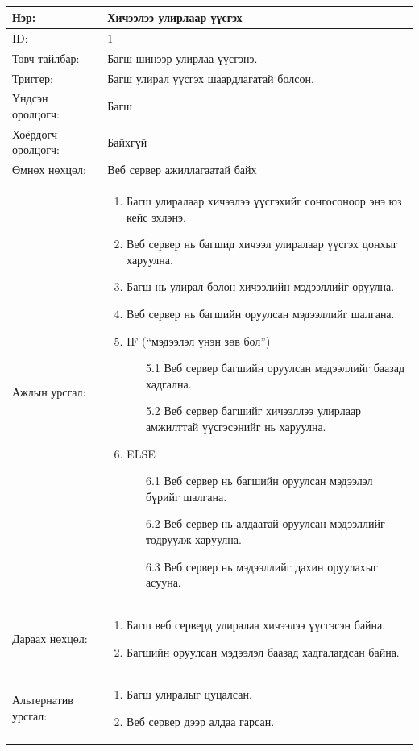 \begin{center}
	\begin{table}[!htbp]
		\caption{}
		\begin{tabular}{|p{4cm}|p{11cm}|}
			\hline
			Нэр: & Хичээлээ улирлаар үүсгэх\\
			\hline
			ID: & 1 \\
			\hline
			Товч тайлбар: & Багш шинээр улирлаа үүсгэнэ. \\
			\hline
			Триггер: & Багш улирал үүсгэх шаардлагатай болсон. \\
			\hline
			Үндсэн оролцогч: & Багш \\
			\hline
			Хоёрдогч оролцогч: & Байхгүй  \\
			\hline
			Өмнөх нөхцөл: &  Веб сервер ажиллагаатай байх\\
			\hline
			Ажлын урсгал: & \begin{enumerate}
				\item Багш улиралаар хичээлээ үүсгэхийг сонгосоноор энэ юз кейс эхлэнэ. 
				\item Веб сервер нь багшид хичээл улиралаар үүсгэх цонхыг харуулна. 
				\item Багш нь улирал болон хичээлийн мэдээллийг оруулна. 
				\item Веб сервер нь багшийн оруулсан мэдээллийг шалгана. 
				\item IF (“мэдээлэл үнэн зөв бол”)
				\begin{enumerate}
					\item[5.1] Веб сервер багшийн оруулсан мэдээллийг баазад хадгална.
					\item[5.2] Веб сервер багшийг хичээллээ улирлаар амжилттай үүсгэсэнийг нь харуулна. 
				\end{enumerate}
				\item ELSE
				\begin{enumerate}
					\item[6.1] Веб сервер нь багшийн оруулсан мэдээлэл бүрийг шалгана.  
					\item[6.2] Веб сервер нь алдаатай оруулсан мэдээллийг тодруулж харуулна. 
					\item[6.3] Веб сервер нь мэдээллийг дахин оруулахыг асууна. 
				\end{enumerate}
			\end{enumerate}
			\\					  \hline
			Дараах нөхцөл: &
			\begin{enumerate}
				\item Багш веб серверд улиралаа хичээлээ үүсгэсэн байна. 
				\item Багшийн оруулсан мэдээлэл баазад хадгалагдсан байна. 
			\end{enumerate}	   
			\\				   \hline
			Альтернатив урсгал: &  \begin{enumerate}
				\item Багш улиралыг цуцалсан.
				\item Веб сервер дээр алдаа гарсан. 
			\end{enumerate}
			\\	\hline
		\end{tabular}
	\end{table}
\end{center}

